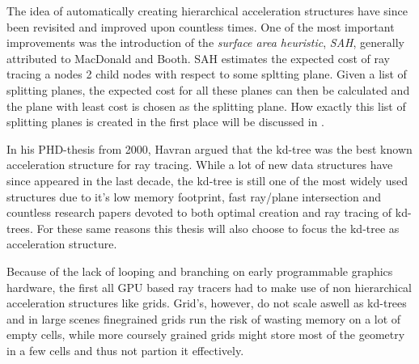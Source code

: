 
The idea of automatically creating hierarchical acceleration
structures have since been revisited and improved upon countless
times. One of the most important improvements was the introduction of
the \textit{surface area heuristic}, \textit{SAH}, generally
attributed to MacDonald and Booth. SAH
estimates the expected cost of ray tracing a nodes 2 child nodes with
respect to some spltting plane. Given a list of splitting planes, the
expected cost for all these planes can then be calculated and the
plane with least cost is chosen as the splitting plane. How exactly
this list of splitting planes is created in the first place will be
discussed in .



In his PHD-thesis from 2000, Havran argued that
the kd-tree was the best known acceleration structure for ray
tracing. While a lot of new data structures have since appeared in the
last decade, the kd-tree is still one of the most widely used
structures due to it's low memory footprint, fast ray/plane
intersection and countless research papers devoted to both optimal
creation and ray tracing of kd-trees. For these same reasons this
thesis will also choose to focus the kd-tree as acceleration
structure.




Because of the lack of looping and branching on early programmable
graphics hardware, the first all GPU based ray tracers had to make use
of non hierarchical acceleration structures like
grids. Grid's, however, do not scale aswell as
kd-trees and in large scenes finegrained grids run the risk of wasting
memory on a lot of empty cells, while more coursely grained grids
might store most of the geometry in a few cells and thus not partion
it effectively.


